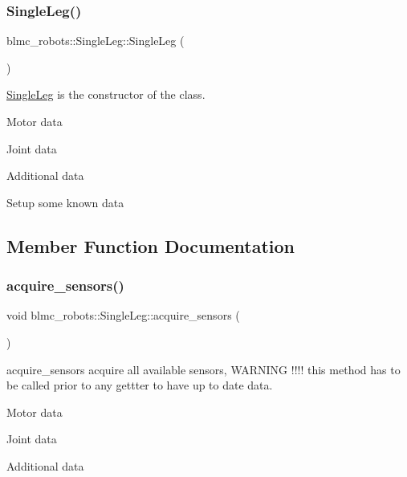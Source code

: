 \subsubsection{\texorpdfstring{Single\+Leg()}{SingleLeg()}}
{\footnotesize\ttfamily blmc\+\_\+robots\+::\+Single\+Leg\+::\+Single\+Leg (\begin{DoxyParamCaption}{ }\end{DoxyParamCaption})}



\hyperlink{classblmc__robots_1_1SingleLeg}{Single\+Leg} is the constructor of the class. 

Motor data

Joint data

Additional data

Setup some known data

\subsection{Member Function Documentation}
\mbox{\label{classblmc__robots_1_1SingleLeg_a093a696ad34f00e92adcc4eb282a37d9}} 
\subsubsection{\texorpdfstring{acquire\+\_\+sensors()}{acquire\_sensors()}}
{\footnotesize\ttfamily void blmc\+\_\+robots\+::\+Single\+Leg\+::acquire\+\_\+sensors (\begin{DoxyParamCaption}{ }\end{DoxyParamCaption})}



acquire\+\_\+sensors acquire all available sensors, W\+A\+R\+N\+I\+NG !!!! this method has to be called prior to any gettter to have up to date data. 

Motor data

Joint data

Additional data\mbox{\label{classblmc__robots_1_1SingleLeg_a3048925f67d4585e45200e6de05b73ac}} 
